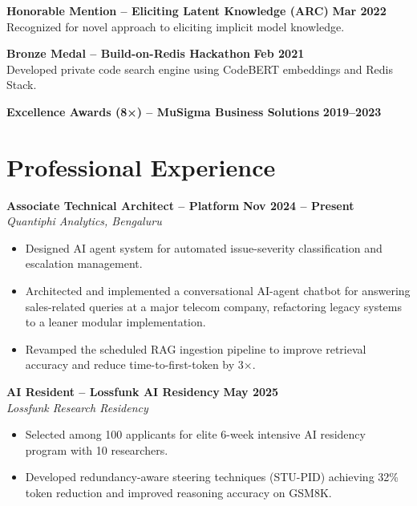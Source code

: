 \documentclass[11pt]{article}
\begin{document}
\textbf{Honorable Mention – Eliciting Latent Knowledge (ARC)} \hfill \textbf{Mar 2022}\\
Recognized for novel approach to eliciting implicit model knowledge.

\textbf{Bronze Medal – Build-on-Redis Hackathon} \hfill \textbf{Feb 2021}\\
Developed private code search engine using CodeBERT embeddings and Redis Stack.

\textbf{Excellence Awards (8×) – MuSigma Business Solutions} \hfill \textbf{2019–2023}

\newpage
\section{Professional Experience}

\textbf{Associate Technical Architect – Platform} \hfill \textbf{Nov 2024 – Present}\\
\textit{Quantiphi Analytics, Bengaluru}
\begin{itemize}[leftmargin=*,nosep]
\item Designed AI agent system for automated issue-severity classification and escalation management.
\item Architected and implemented a conversational AI-agent chatbot for answering sales-related queries at a major telecom company, refactoring legacy systems to a leaner modular implementation.
\item Revamped the scheduled RAG ingestion pipeline to improve retrieval accuracy and reduce time-to-first-token by 3×.
\end{itemize}

\textbf{AI Resident – Lossfunk AI Residency} \hfill \textbf{May 2025}\\
\textit{Lossfunk Research Residency}
\begin{itemize}[leftmargin=*,nosep]
\item Selected among 100 applicants for elite 6-week intensive AI residency program with 10 researchers.
\item Developed redundancy-aware steering techniques (STU-PID) achieving 32\% token reduction and improved reasoning accuracy on GSM8K.
\end{itemize}
\end{document}
